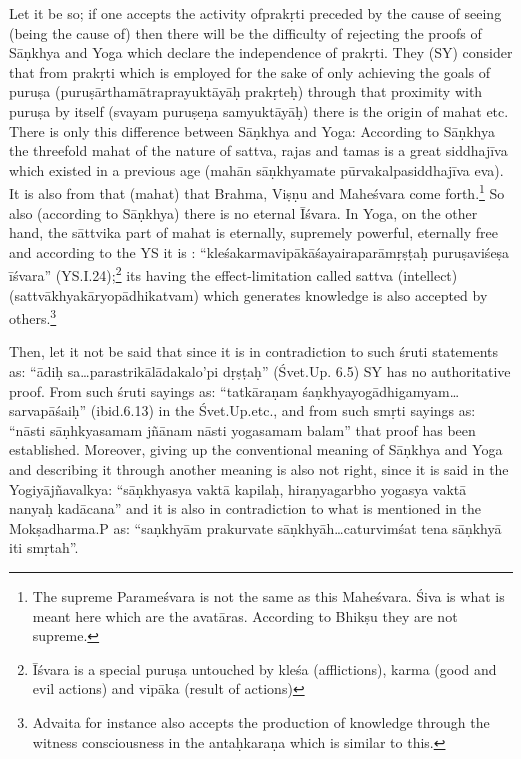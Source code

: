 Let it be so; if one accepts the activity ofprakṛti preceded by the cause of seeing  (being the cause of) then there will be the difficulty of rejecting the proofs of Sāṇkhya and Yoga which  declare the independence of prakṛti. They (SY) consider that from prakṛti which is employed for the sake of only achieving the goals of puruṣa (puruṣārthamātraprayuktāyāḥ prakṛteḥ) through that proximity with puruṣa by itself (svayam puruṣeṇa samyuktāyāḥ) there is the origin of mahat etc. There is only this difference between Sāṇkhya and Yoga: According to Sāṇkhya the threefold mahat of the nature of sattva, rajas and tamas is a great siddhajīva which existed in a previous age (mahān sāṇkhyamate pūrvakalpasiddhajīva eva). It is also from that (mahat) that Brahma, Viṣṇu and Maheśvara come forth.\footnote{The supreme Parameśvara is not the same as this Maheśvara. Śiva is what is meant here which are the avatāras. According to Bhikṣu they are not supreme.} So also (according to Sāṇkhya) there is no eternal Īśvara. In Yoga, on the other hand, the sāttvika part of mahat is eternally, supremely powerful, eternally free and according to the YS it is : “kleśakarmavipākāśayairaparāmṛṣṭaḥ puruṣaviśeṣa īśvara” (YS.I.24);\footnote{Īśvara is a special puruṣa untouched by kleśa (afflictions), karma (good and evil actions) and vipāka (result of actions)} its having the effect-limitation called sattva (intellect) (sattvākhyakāryopādhikatvam) which generates knowledge is also accepted by others.\footnote{Advaita for instance also accepts the production of knowledge through the witness consciousness in the antaḥkaraṇa which is similar to this.} 

Then, let it not be said that since it is in contradiction to such śruti statements as: “ādiḥ sa…parastrikālādakalo’pi dṛṣṭaḥ” (Śvet.Up. 6.5) SY has no authoritative proof.  From such śruti sayings as: “tatkāraṇam śaṇkhyayogādhigamyam…sarvapāśaiḥ” (ibid.6.13) in the Śvet.Up.etc., and from such smṛti sayings as: “nāsti sāṇhkyasamam jñānam nāsti yogasamam balam” that proof has been established. Moreover, giving up the conventional meaning of Sāṇkhya and Yoga and describing it through another meaning is also not right, since it is said in the Yogiyājñavalkya: “sāṇkhyasya vaktā kapilaḥ, hiraṇyagarbho yogasya vaktā nanyaḥ kadācana” and it is also in contradiction to what is mentioned in the Mokṣadharma.P as: “saṇkhyām prakurvate sāṇkhyāh…caturvimśat tena sāṇkhyā iti smṛtah”.

